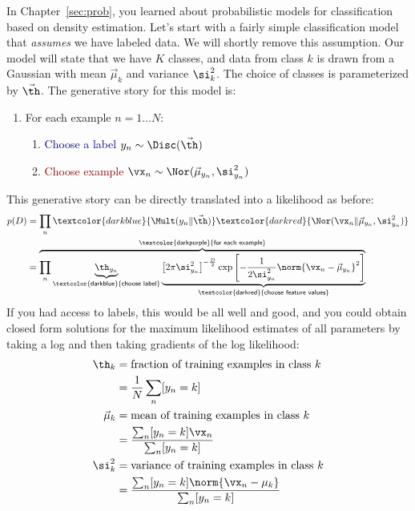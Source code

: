 In Chapter~\ref{sec:prob}, you learned about probabilistic models for
classification based on density estimation.  Let's start with a fairly
simple classification model that \emph{assumes} we have labeled data.
We will shortly remove this assumption.  Our model will state that we
have $K$ classes, and data from class $k$ is drawn from a Gaussian
with mean $\vec\mu_k$ and variance $\si^2_k$.  The choice of classes
is parameterized by $\vec\th$.  The generative story for this model
is:
%
\begin{enumerate}
  \item \textcolor{darkpurple}{For each example} $n = 1 \dots N$:
    \begin{enumerate}
      \item \textcolor{darkblue}{Choose a label} $y_n \sim \Disc(\vec\th)$
      \item \textcolor{darkred}{Choose example} $\vx_n \sim \Nor(\vec\mu_{y_n}, \si^2_{y_n})$
     \end{enumerate}
\end{enumerate}
%
This generative story can be directly translated into a likelihood
as before:
%
\begin{align}
  p(D)
  &= \prod_n \textcolor{darkblue}{\Mult(y_n \| \vec\th)} \textcolor{darkred}{\Nor(\vx_n \| \vec\mu_{y_n}, \si^2_{y_n})}\\
  &=  \overbrace{
      \prod_n
       \underbrace{\th_{y_n}}_{\textsf{\textcolor{darkblue}{choose label}}}
         \underbrace{
         \left[2 \pi \si_{y_n}^2\right]^{-\frac D 2}
         \exp\left[
           -\frac 1 {2 \si_{y_n}^2} \norm{\vx_n - \vec\mu_{y_n}}^2
           \right]}_{\textsf{\textcolor{darkred}{choose feature values}}}}
       ^{\textsf{\textcolor{darkpurple}{for each example}}}
\end{align}
%
If you had access to labels, this would be all well and good, and you
could obtain closed form solutions for the maximum likelihood
estimates of all parameters by taking a log and then taking gradients
of the log likelihood:
%
\begin{align}
\th_k &= \text{fraction of training examples in class $k$} \label{eq:em:mlfrac}\\
&= \frac 1 N \sum_n [y_n = k] \nonumber\\
\vec\mu_k &= \text{mean of training examples in class $k$} \\
&= \frac {\sum_n [y_n = k] \vx_n} {\sum_n [y_n = k]} \nonumber\\
\si^2_k &= \text{variance of training examples in class $k$} \label{eq:em:mlvar}\\
&= \frac {\sum_n [y_n = k] \norm{\vx_n-\mu_k}} {\sum_n [y_n = k]} \nonumber
\end{align}
